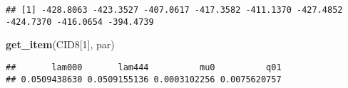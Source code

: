 \documentclass[
]{article}
\newenvironment{Shaded}{\begin{snugshade}}{\end{snugshade}}
\newcommand{\DecValTok}[1]{\textcolor[rgb]{0.00,0.00,0.81}{#1}}
\newcommand{\FunctionTok}[1]{\textcolor[rgb]{0.13,0.29,0.53}{\textbf{#1}}}
\newcommand{\NormalTok}[1]{#1}
\newcommand{\SpecialCharTok}[1]{\textcolor[rgb]{0.81,0.36,0.00}{\textbf{#1}}}
\newcommand{\StringTok}[1]{\textcolor[rgb]{0.31,0.60,0.02}{#1}}
\begin{document}
\begin{verbatim}
## [1] -428.8063 -423.3527 -407.0617 -417.3582 -411.1370 -427.4852 -424.7370 -416.0654 -394.4739
\end{verbatim}

\begin{Shaded}
\begin{Highlighting}[]
\FunctionTok{get\_item}\NormalTok{(CID8[}\DecValTok{1}\NormalTok{], }\StringTok{\textquotesingle{}par\textquotesingle{}}\NormalTok{)}
\end{Highlighting}
\end{Shaded}

\begin{verbatim}
##       lam000       lam444          mu0          q01 
## 0.0509438630 0.0509155136 0.0003102256 0.0075620757
\end{verbatim}

\begin{Shaded}
\end{Shaded}
\end{document}
